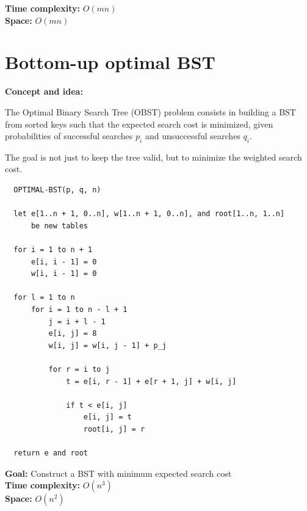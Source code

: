 \documentclass[11pt,a4paper,openany]{book}
\begin{document}
\textbf{Time complexity:} $O(mn)$ \\

\textbf{Space:} $O(mn)$







\vspace{2cm}




\section{Bottom-up optimal BST}

  \textbf{Concept and idea:}

  The Optimal Binary Search Tree (OBST) problem consists in building a BST from sorted keys such that the expected search cost is minimized, given probabilities of successful searches $p_i$ and unsuccessful searches $q_i$.

  The goal is not just to keep the tree valid, but to minimize the weighted search cost.

  \begin{lstlisting}
  OPTIMAL-BST(p, q, n)

  let e[1..n + 1, 0..n], w[1..n + 1, 0..n], and root[1..n, 1..n]
      be new tables

  for i = 1 to n + 1
      e[i, i - 1] = 0
      w[i, i - 1] = 0

  for l = 1 to n
      for i = 1 to n - l + 1
          j = i + l - 1
          e[i, j] = 8
          w[i, j] = w[i, j - 1] + p_j

          for r = i to j
              t = e[i, r - 1] + e[r + 1, j] + w[i, j]

              if t < e[i, j]
                  e[i, j] = t
                  root[i, j] = r

  return e and root
  \end{lstlisting}

  \textbf{Goal:} Construct a BST with minimum expected search cost \\

  \textbf{Time complexity:} $O(n^3)$ \\

  \textbf{Space:} $O(n^2)$







\vspace{2cm}
\end{document}
